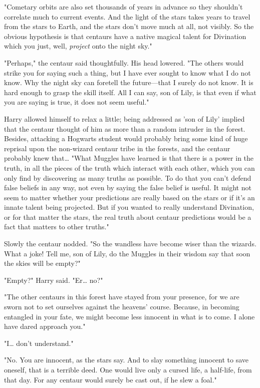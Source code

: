 "Cometary orbits are also set thousands of years in advance so they shouldn't 
correlate much to current events. And the light of the stars takes years to 
travel from the stars to Earth, and the stars don't move much at all, not 
visibly. So the obvious hypothesis is that centaurs have a native magical 
talent for Divination which you just, well, \emph{project} onto the night sky."

"Perhaps," the centaur said thoughtfully. His head lowered. "The others would 
strike you for saying such a thing, but I have ever sought to know what I do 
not know. Why the night sky can foretell the future---that I surely do not 
know. It is hard enough to grasp the skill itself. All I can say, son of Lily, 
is that even if what you are saying is true, it does not seem useful."

Harry allowed himself to relax a little; being addressed as 'son of Lily' 
implied that the centaur thought of him as more than a random intruder in the 
forest. Besides, attacking a Hogwarts student would probably bring some kind of 
huge reprisal upon the non-wizard centaur tribe in the forests, and the centaur 
probably knew that{\ldots} "What Muggles have learned is that there is a power 
in the truth, in all the pieces of the truth which interact with each other, 
which you can only find by discovering as many truths as possible. To do that 
you can't defend false beliefs in any way, not even by saying the false belief 
is useful. It might not seem to matter whether your predictions are really 
based on the stars or if it's an innate talent being projected. But if you 
wanted to really understand Divination, or for that matter the stars, the real 
truth about centaur predictions would be a fact that matters to other truths."

Slowly the centaur nodded. "So the wandless have become wiser than the wizards. 
What a joke! Tell me, son of Lily, do the Muggles in their wisdom say that soon 
the skies will be empty?"

"Empty?" Harry said. "Er{\ldots} no?"

"The other centaurs in this forest have stayed from your presence, for we are 
sworn not to set ourselves against the heavens' course. Because, in becoming 
entangled in your fate, we might become less innocent in what is to come. I 
alone have dared approach you."

"I{\ldots} don't understand."

"No. You are innocent, as the stars say. And to slay something innocent to save 
oneself, that is a terrible deed. One would live only a cursed life, a 
half-life, from that day. For any centaur would surely be cast out, if he slew 
a foal."


